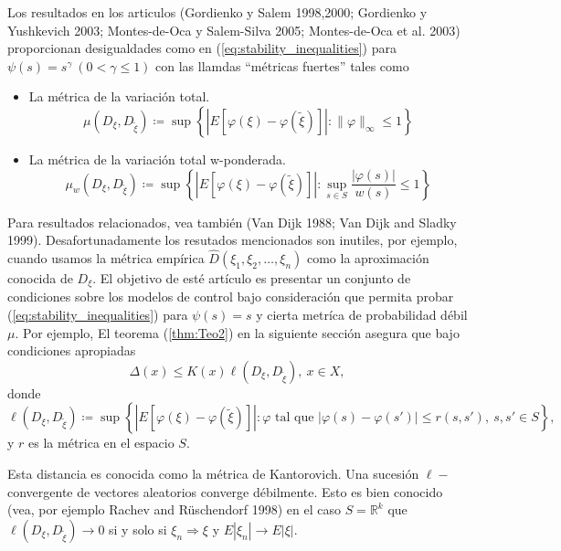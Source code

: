 \documentclass[11pt, spanish]{amsart}
\begin{document}
Los resultados en los articulos (Gordienko y Salem 1998,2000; Gordienko
y Yushkevich 2003; Montes-de-Oca y Salem-Silva 2005; Montes-de-Oca
et al. 2003) proporcionan desigualdades como en (\ref{eq:stability_inequalities})
para $\psi\left(s\right)=s^{\gamma}\ \left(0<\gamma\leq1\right)$
con las llamdas ``métricas fuertes'' tales como
\begin{itemize}
\item La métrica de la variación total.
\[
\mu\left(D_{\xi},D_{\widetilde{\xi}}\right)\coloneqq\sup\left\{ \left|E\left[\varphi\left(\xi\right)-\varphi\left(\widetilde{\xi}\right)\right]\right|:\|\varphi\|_{\infty}\leq1\right\} 
\]
\item La métrica de la variación total w-ponderada.
\[
\mu_{w}\left(D_{\xi},D_{\widetilde{\xi}}\right)\coloneqq\sup\left\{ \left|E\left[\varphi\left(\xi\right)-\varphi\left(\widetilde{\xi}\right)\right]\right|:\sup_{s\in S}\dfrac{\left|\varphi\left(s\right)\right|}{w\left(s\right)}\leq1\right\} 
\]
\end{itemize}
%
Para resultados relacionados, vea también (Van Dijk 1988; Van Dijk
and Sladky 1999). Desafortunadamente los resutados mencionados son
inutiles, por ejemplo, cuando usamos la métrica empírica $\widehat{D}\left(\xi_{1},\xi_{2},\ldots,\xi_{n}\right)$
como la aproximación conocida de $D_{\xi}$. El objetivo de esté artículo
es presentar un conjunto de condiciones sobre los modelos de control
bajo consideración que permita probar (\ref{eq:stability_inequalities})
para $\psi\left(s\right)=s$ y cierta metríca de probabilidad débil
$\mu$. Por ejemplo, El teorema (\ref{thm:Teo2}) en la siguiente
sección asegura que bajo condiciones apropiadas 
\begin{equation}
\Delta\left(x\right)\leq K\left(x\right)\ell\left(D_{\xi},D_{\widetilde{\xi}}\right),\ x\in X,\label{eq:apropiate_stab_inequality}
\end{equation}
donde 
\begin{equation}
\ell\left(D_{\xi},D_{\widetilde{\xi}}\right)\coloneqq\sup\left\{ \left|E\left[\varphi\left(\xi\right)-\varphi\left(\widetilde{\xi}\right)\right]\right|:\varphi\text{ tal que }\left|\varphi\left(s\right)-\varphi\left(s'\right)\right|\leq r\left(s,s'\right),\ s,s'\in S\right\} ,\label{eq:Kantorovich_metric}
\end{equation}
y $r$ es la métrica en el espacio $S$. 

Esta distancia es conocida como la métrica de Kantorovich. Una sucesión
$\ell-$convergente de vectores aleatorios converge débilmente. Esto
es bien conocido (vea, por ejemplo Rachev and Rüschendorf 1998) en
el caso $S=\mathbb{R}^{k}$ que $\ell\left(D_{\xi},D_{\widetilde{\xi}}\right)\to0$
si y solo si $\xi_{n}\Rightarrow\xi$ y $E\left|\xi_{n}\right|\to E\left|\xi\right|$.
\end{document}
